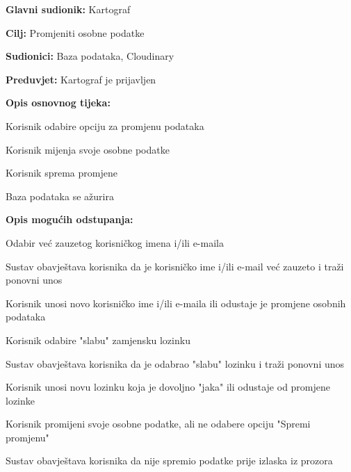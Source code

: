 					\noindent {}
					\begin{packed_item}
						
						\item \textbf{Glavni sudionik: }Kartograf
						\item  \textbf{Cilj:} Promjeniti osobne podatke
						\item  \textbf{Sudionici:} Baza podataka, Cloudinary
						\item  \textbf{Preduvjet:} Kartograf je prijavljen
						\item  \textbf{Opis osnovnog tijeka:}
						
						\item[] \begin{packed_enum}
							
							\item Korisnik odabire opciju za promjenu podataka
							\item Korisnik mijenja svoje osobne podatke
							\item Korisnik sprema promjene
							\item Baza podataka se ažurira
						\end{packed_enum}
						
						\item  \textbf{Opis mogućih odstupanja:}
						
						\item[] \begin{packed_item}
							
							\item Odabir već zauzetog korisničkog imena i/ili e-maila
							\item[] \begin{packed_enum}
								
								\item Sustav obavještava korisnika da je korisničko ime i/ili e-mail već zauzeto i traži ponovni unos
								\item Korisnik unosi novo korisničko ime i/ili e-maila ili odustaje je promjene osobnih podataka
								
							\end{packed_enum}
							\item Korisnik odabire "slabu" zamjensku lozinku
							\item[] \begin{packed_enum}
								\item Sustav obavještava korisnika da je odabrao "slabu" lozinku i traži ponovni unos
								\item Korisnik unosi novu lozinku koja je dovoljno "jaka" ili odustaje od promjene lozinke
							\end{packed_enum}
							\item Korisnik promijeni svoje osobne podatke, ali ne odabere opciju "Spremi promjenu"
							\item[] \begin{packed_enum}
								\item Sustav obavještava korisnika da nije spremio podatke prije izlaska iz prozora
							\end{packed_enum}
							

\end{packed_item}
\end{packed_item}
